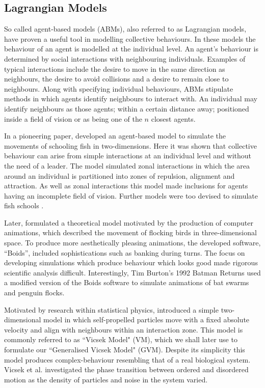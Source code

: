 \subsection{Lagrangian Models}
\label{ssec:lagrangian_models}

So called agent-based models (ABMs), also referred to as Lagrangian models, have proven a useful tool in modelling collective behaviours. In these models the behaviour of an agent is modelled at the individual level. An agent's behaviour is determined by social interactions with neighbouring individuals. Examples of typical interactions include the desire to move in the same direction as neighbours, the desire to avoid collisions and a desire to remain close to neighbours. Along with specifying individual behaviours, ABMs stipulate methods in which agents identify neighbours to interact with. An individual may identify neighbours as those agents; within a certain distance away; positioned inside a field of vision or as being one of the $n$ closest agents.
	
In a pioneering paper, \citet{aoki82} developed an agent-based model to simulate the movements of schooling fish in two-dimensions. Here it was shown that collective behaviour can arise from simple interactions at an individual level and without the need of a leader. The model simulated zonal interactions in which the area around an individual is partitioned into zones of repulsion, alignment and attraction. As well as zonal interactions this model made inclusions for agents having an incomplete field of vision. Further models were too devised to simulate fish schools \citep{okubo86, huth92}.

Later, \citet{reynolds87} formulated a theoretical model motivated by the production of computer animations, which described the movement of flocking birds in three-dimensional space. To produce more aesthetically pleasing animations, the developed software, ``Boids'', included sophistications such as banking during turns. The focus on developing simulations which produce behaviour which looks good made rigorous scientific analysis difficult. Interestingly, Tim Burton's 1992 Batman Returns used a modified version of the Boids software to simulate animations of bat swarms and penguin flocks.

Motivated by research within statistical physics, \citet{vicsek95} introduced a simple two-dimensional model in which self-propelled particles move with a fixed absolute velocity and align with neighbours within an interaction zone. This model is commonly referred to as ``Vicsek Model" (VM), which we shall later use to formulate our ``Generalised Vicsek Model" (GVM). Despite its simplicity this model produces complex-behaviour resembling that of a real biological system. Vicsek et al. investigated the phase transition between ordered and disordered motion as the density of particles and noise in the system varied.

